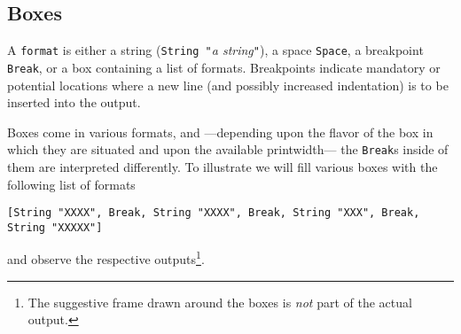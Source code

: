   \subsection{Boxes}

  A {\tt format} is either a string ({\tt String "}{\it a string}{\tt "}),
  a space {\tt Space}, a breakpoint {\tt Break},
  or a box containing a list of formats.
  Breakpoints indicate mandatory or potential locations where
  a new line (and possibly increased indentation) is to be
  inserted into the output.

  Boxes come in various formats, and ---depending upon the flavor of the
  box in which they are situated and upon the available printwidth---
  the {\tt Break}s inside of them are interpreted differently.
  To illustrate we will fill various boxes with the following list of formats
  \begin{center}
  {\tt [String "XXXX", Break, String "XXXX", Break, String "XXX",
        Break, String "XXXXX"]}
  \end{center}
  and observe the respective outputs\footnote{The suggestive frame drawn
    around the boxes is {\em not} part of the actual output.}.
